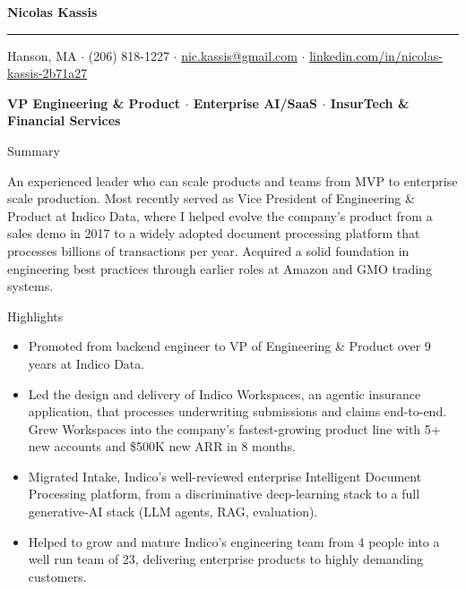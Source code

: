 \documentclass[10pt,oneside]{article}
\makeatletter
\newcommand{\name}{Nicolas Kassis}
\newcommand{\location}{Hanson, MA}
\newcommand{\phone}{(206) 818-1227}
\newcommand{\email}{nic.kassis@gmail.com}
\newcommand{\linkedinurl}{linkedin.com/in/nicolas-kassis-2b71a27}
\newcommand{\bigname}[1]{
  \begin{center}\fontfamily{phv}\selectfont\Huge\bfseries#1\end{center}
}
\newcommand{\headline}[1]{
  \begin{center}\fontfamily{phv}\selectfont\small\bfseries#1\end{center}
}
\newenvironment{ressection}[1]{
  \vspace{4pt}
  {\fontfamily{phv}\selectfont\Large#1}
  \begin{itemize}
    \vspace{3pt}
}{
  \end{itemize}
}
\newcommand{\ressubitem}[1]{
  \vspace{-1pt}
\item \begin{flushleft} #1 \end{flushleft}
}
\makeatother
\begin{document}
\bigname{\name}
\vspace{-8pt} \rule{\textwidth}{1pt}
\vspace{2pt}
\begin{center}
  {\small \location{} \; $\cdot$ \; \phone{} \; $\cdot$ \; \href{mailto:\email}{\email} \; $\cdot$ \; \href{https://\linkedinurl}{\linkedinurl}}
\end{center}
\headline{VP Engineering \& Product $\cdot$ Enterprise AI/SaaS $\cdot$ InsurTech \& Financial Services}
\vspace{6pt}

\vspace{4pt}
{\selectfont\Large Summary}
\vspace{3pt}

\begin{flushleft}
An experienced leader who can scale products and teams from MVP to enterprise scale production. Most recently served as Vice President of Engineering \& Product at Indico Data, where I helped evolve the company's product from a sales demo in 2017 to a widely adopted document processing platform that processes billions of transactions per year. Acquired a solid foundation in engineering best practices through earlier roles at Amazon and GMO trading systems.
\end{flushleft}

\begin{ressection}{Highlights}
  \ressubitem{Promoted from backend engineer to VP of Engineering \& Product over 9 years at Indico Data.}
  \ressubitem{Led the design and delivery of Indico Workspaces, an agentic insurance application, that processes underwriting submissions and claims end-to-end. Grew Workspaces into the company's fastest-growing product line with 5+ new accounts and \$500K new ARR in 8 months.}
  \ressubitem{Migrated Intake, Indico's well-reviewed enterprise Intelligent Document Processing platform, from a discriminative deep-learning stack to a full generative-AI stack (LLM agents, RAG, evaluation).}
  \ressubitem{Helped to grow and mature Indico's engineering team from 4 people into a well run team of 23, delivering enterprise products to highly demanding customers.}
\end{ressection}
\end{document}
